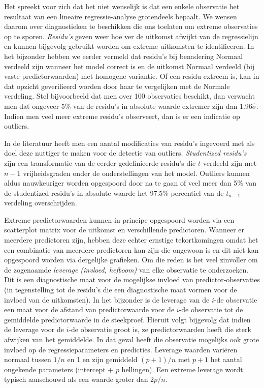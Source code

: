 \documentclass[12pt,dutch,coursenotes]{book}
\theoremstyle{definition}
\theoremstyle{definition}
\theoremstyle{definition}
\theoremstyle{remark}
\begin{document}
Het spreekt voor zich dat het niet wenselijk is dat een enkele
observatie het resultaat van een lineaire regressie-analyse grotendeels
bepaalt. We wensen daarom over diagnostieken te beschikken die ons
toelaten om extreme observaties op te sporen. \emph{Residu's} geven weer
hoe ver de uitkomst afwijkt van de regressielijn en kunnen bijgevolg
gebruikt worden om extreme uitkomsten te identificeren. In het bijzonder
hebben we eerder vermeld dat residu's bij benadering Normaal verdeeld
zijn wanneer het model correct is en de uitkomst Normaal verdeeld (bij
vaste predictorwaarden) met homogene variantie. Of een residu extreem
is, kan in dat opzicht geverifieerd worden door haar te vergelijken met
de Normale verdeling. Stel bijvoorbeeld dat men over 100 observaties
beschikt, dan verwacht men dat ongeveer 5\% van de residu's in absolute
waarde extremer zijn dan 1.96\(\hat{\sigma}\). Indien men veel meer
extreme residu's observeert, dan is er een indicatie op outliers.

In de literatuur heeft men een aantal modificaties van residu's
ingevoerd met als doel deze nuttiger te maken voor de detectie van
outliers. \emph{Studentized residu's} zijn een transformatie van de
eerder gedefinieerde residu's die \(t\)-verdeeld zijn met \(n-1\)
vrijheidsgraden onder de onderstellingen van het model. Outliers kunnen
aldus nauwkeuriger worden opgespoord door na te gaan of veel meer dan
5\% van de studentized residu's in absolute waarde het 97.5\% percentiel
van de \(t_{n-1}\)-verdeling overschrijden.

Extreme predictorwaarden kunnen in principe opgespoord worden via een
scatterplot matrix voor de uitkomst en verschillende predictoren.
Wanneer er meerdere predictoren zijn, hebben deze echter ernstige
tekortkomingen omdat het een combinatie van meerdere predictoren kan
zijn die ongewoon is en dit niet kan opgespoord worden via dergelijke
grafieken. Om die reden is het veel zinvoller om de zogenaamde
\emph{leverage (invloed, hefboom)} van elke observatie te onderzoeken.
Dit is een diagnostische maat voor de mogelijkse invloed van
predictor-observaties (in tegenstelling tot de residu's die een
diagnostische maat vormen voor de invloed van de uitkomsten). In het
bijzonder is de leverage van de \(i\)-de observatie een maat voor de
afstand van predictorwaarde voor de \(i\)-de observatie tot de
gemiddelde predictorwaarde in de steekproef. Hieruit volgt bijgevolg dat
indien de leverage voor de \(i\)-de observatie groot is, ze
predictorwaarden heeft die sterk afwijken van het gemiddelde. In dat
geval heeft die observatie mogelijks ook grote invloed op de
regressieparameters en predicties. Leverage waarden variëren normaal
tussen \(1/n\) en 1 en zijn gemiddeld \((p+1)/n\) met \(p+1\) het aantal
ongekende parameters (intercept + \(p\) hellingen). Een extreme leverage
wordt typisch aanschouwd als een waarde groter dan \(2p/n\).
\end{document}
